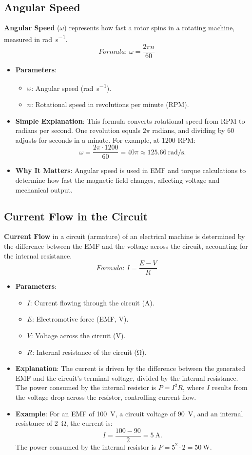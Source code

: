 \documentclass[12pt]{article}
\newcommand{\concept}[1]{\textbf{#1}}
\newcommand{\formula}[1]{\textit{Formula: }#1}
\begin{document}
\subsection{Angular Speed}
\concept{Angular Speed} (\(\omega\)) represents how fast a rotor spins in a rotating machine, measured in \si{\radian\per\second}.
\[
\formula{\omega = \frac{2 \pi n}{60}}
\]
\begin{itemize}
    \item \textbf{Parameters}:
        \begin{itemize}
            \item \(\omega\): Angular speed (\si{\radian\per\second}).
            \item \(n\): Rotational speed in revolutions per minute (RPM).
        \end{itemize}
    \item \textbf{Simple Explanation}: This formula converts rotational speed from RPM to radians per second. One revolution equals \(2\pi\) radians, and dividing by 60 adjusts for seconds in a minute. For example, at 1200 RPM:
        \[
        \omega = \frac{2 \pi \cdot 1200}{60} = 40\pi \approx \SI{125.66}{\radian\per\second}.
        \]
    \item \textbf{Why It Matters}: Angular speed is used in EMF and torque calculations to determine how fast the magnetic field changes, affecting voltage and mechanical output.
\end{itemize}
\subsection{Current Flow in the Circuit}
\concept{Current Flow} in a circuit (armature) of an electrical machine is determined by the difference between the EMF and the voltage across the circuit, accounting for the internal resistance.
\[
\formula{I = \frac{E - V}{R}}
\]
\begin{itemize}
    \item \textbf{Parameters}:
        \begin{itemize}
            \item \(I\): Current flowing through the circuit (\si{\ampere}).
            \item \(E\): Electromotive force (EMF, \si{\volt}).
            \item \(V\): Voltage across the circuit (\si{\volt}).
            \item \(R\): Internal resistance of the circuit (\si{\ohm}).
        \end{itemize}
    \item \textbf{Explanation}: The current is driven by the difference between the generated EMF and the circuit’s terminal voltage, divided by the internal resistance. The power consumed by the internal resistor is \(P = I^2 R\), where \(I\) results from the voltage drop across the resistor, controlling current flow.
    \item \textbf{Example}: For an EMF of \SI{100}{\volt}, a circuit voltage of \SI{90}{\volt}, and an internal resistance of \SI{2}{\ohm}, the current is:
        \[
        I = \frac{100 - 90}{2} = \SI{5}{\ampere}.
        \]
        The power consumed by the internal resistor is \(P = 5^2 \cdot 2 = \SI{50}{\watt}\).
\end{itemize}
\end{document}
